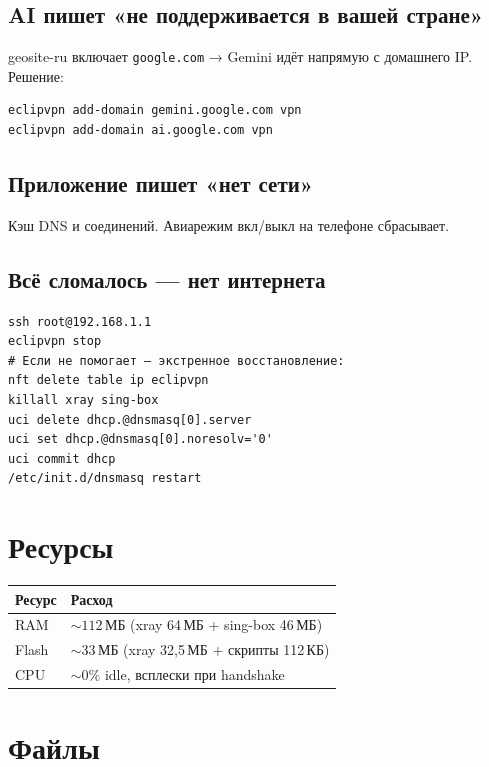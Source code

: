 \documentclass[11pt,a4paper]{article}
\begin{document}
\subsection{AI пишет «не поддерживается в вашей стране»}

geosite-ru включает \texttt{google.com} → Gemini идёт напрямую с домашнего IP. Решение:
\begin{lstlisting}
eclipvpn add-domain gemini.google.com vpn
eclipvpn add-domain ai.google.com vpn
\end{lstlisting}

\subsection{Приложение пишет «нет сети»}

Кэш DNS и соединений. Авиарежим вкл/выкл на телефоне сбрасывает.

\subsection{Всё сломалось — нет интернета}

\begin{lstlisting}
ssh root@192.168.1.1
eclipvpn stop
# Если не помогает — экстренное восстановление:
nft delete table ip eclipvpn
killall xray sing-box
uci delete dhcp.@dnsmasq[0].server
uci set dhcp.@dnsmasq[0].noresolv='0'
uci commit dhcp
/etc/init.d/dnsmasq restart
\end{lstlisting}

\section{Ресурсы}

\begin{tabularx}{\textwidth}{l X}
\toprule
\textbf{Ресурс} & \textbf{Расход} \\
\midrule
RAM & ${\sim}112$\,МБ (xray 64\,МБ + sing-box 46\,МБ) \\
Flash & ${\sim}33$\,МБ (xray 32{,}5\,МБ + скрипты 112\,КБ) \\
CPU & ${\sim}0\%$ idle, всплески при handshake \\
\bottomrule
\end{tabularx}

\section{Файлы}
\end{document}
